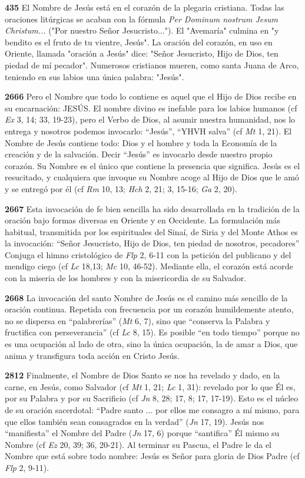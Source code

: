 \documentclass[]{article}
\begin{document}
\textbf{435} El Nombre de Jesús está en el corazón de la plegaria
cristiana. Todas las oraciones litúrgicas se acaban con la fórmula
\emph{Per Dominum nostrum Jesum Christum...} ("Por nuestro Señor
Jesucristo..."). El "Avemaría" culmina en "y bendito es el fruto de tu
vientre, Jesús". La oración del corazón, en uso en Oriente, llamada
"oración a Jesús" dice: "Señor Jesucristo, Hijo de Dios, ten piedad de
mí pecador". Numerosos cristianos mueren, como santa Juana de Arco,
teniendo en sus labios una única palabra: "Jesús".

\textbf{2666} Pero el Nombre que todo lo contiene es aquel que el Hijo
de Dios recibe en su encarnación: JESÚS. El nombre divino es inefable
para los labios humanos (cf \emph{Ex} 3, 14; 33, 19-23), pero el Verbo
de Dios, al asumir nuestra humanidad, nos lo entrega y nosotros podemos
invocarlo: ``Jesús'', ``YHVH salva'' (cf \emph{Mt} 1, 21). El Nombre de
Jesús contiene todo: Dios y el hombre y toda la Economía de la creación
y de la salvación. Decir ``Jesús'' es invocarlo desde nuestro propio
corazón. Su Nombre es el único que contiene la presencia que significa.
Jesús es el resucitado, y cualquiera que invoque su Nombre acoge al Hijo
de Dios que le amó y se entregó por él (cf \emph{Rm} 10, 13; \emph{Hch}
2, 21; 3, 15-16; \emph{Ga} 2, 20).

\textbf{2667} Esta invocación de fe bien sencilla ha sido desarrollada
en la tradición de la oración bajo formas diversas en Oriente y en
Occidente. La formulación más habitual, transmitida por los espirituales
del Sinaí, de Siria y del Monte Athos es la invocación: ``Señor
Jesucristo, Hijo de Dios, ten piedad de nosotros, pecadores'' Conjuga el
himno cristológico de \emph{Flp} 2, 6-11 con la petición del publicano y
del mendigo ciego (cf \emph{Lc} 18,13; \emph{Mc} 10, 46-52). Mediante
ella, el corazón está acorde con la miseria de los hombres y con la
misericordia de su Salvador.

\textbf{2668} La invocación del santo Nombre de Jesús es el camino más
sencillo de la oración continua. Repetida con frecuencia por un corazón
humildemente atento, no se dispersa en ``palabrerías'' (\emph{Mt} 6, 7),
sino que ``conserva la Palabra y fructifica con perseverancia'' (cf
\emph{Lc} 8, 15). Es posible ``en todo tiempo'' porque no es una
ocupación al lado de otra, sino la única ocupación, la de amar a Dios,
que anima y transfigura toda acción en Cristo Jesús.

\textbf{2812} Finalmente, el Nombre de Dios Santo se nos ha revelado y
dado, en la carne, en Jesús, como Salvador (cf \emph{Mt} 1, 21;
\emph{Lc} 1, 31): revelado por lo que Él es, por su Palabra y por su
Sacrificio (cf \emph{Jn} 8, 28; 17, 8; 17, 17-19). Esto es el núcleo de
su oración sacerdotal: ``Padre santo ... por ellos me consagro a mí
mismo, para que ellos también sean consagrados en la verdad'' (\emph{Jn}
17, 19). Jesús nos ``manifiesta'' el Nombre del Padre (\emph{Jn} 17, 6)
porque ``santifica'' Él mismo su Nombre (cf \emph{Ez} 20, 39; 36,
20-21). Al terminar su Pascua, el Padre le da el Nombre que está sobre
todo nombre: Jesús es Señor para gloria de Dios Padre (cf \emph{Flp} 2,
9-11).
\end{document}
